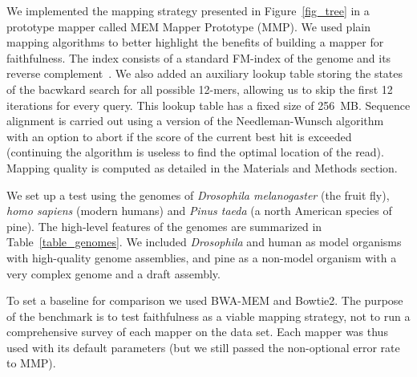 \documentclass[a4,center,fleqn]{NAR}
\begin{document}
We implemented the mapping strategy presented in Figure~\ref{fig_tree} in
a prototype mapper called MEM Mapper Prototype (MMP). We used plain
mapping algorithms to better highlight the benefits of building a mapper
for faithfulness. The index consists of a standard FM-index of the genome
and its reverse complement~\citep[the implementation is detailed in
ref.][]{blog}. We also added an auxiliary lookup table storing the states
of the bacwkard search for all possible 12-mers, allowing us to skip the
first 12 iterations for every query. This lookup table has a fixed size of
256~MB. Sequence alignment is carried out using a version of the
Needleman-Wunsch algorithm~\cite{pmid5420325} with an option to abort if
the score of the current best hit is exceeded (continuing the algorithm is
useless to find the optimal location of the read). Mapping quality is
computed as detailed in the Materials and Methods section.

We set up a test using the genomes of \textit{Drosophila melanogaster}
(the fruit fly), \textit{homo sapiens} (modern humans) and \textit{Pinus
taeda} (a north American species of pine). The high-level features of the
genomes are summarized in Table~\ref{table_genomes}. We included
\textit{Drosophila} and human as model organisms with high-quality genome
assemblies, and pine as a non-model organism with a very complex genome
and a draft assembly.

To set a baseline for comparison we used BWA-MEM and Bowtie2. The purpose
of the benchmark is to test faithfulness as a viable mapping strategy, not
to run a comprehensive survey of each mapper on the data set. Each mapper
was thus used with its default parameters (but we still passed the
non-optional error rate to MMP).
\end{document}
